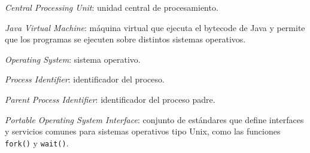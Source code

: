 \frontmatter
\maketitle
\tableofcontents
\listoffigures

\begin{abbreviations}
  \item[CPU] \textit{Central Processing Unit}: unidad central de procesamiento.
  \item[JVM] \textit{Java Virtual Machine}: máquina virtual que ejecuta el
  bytecode de Java y permite que los programas se ejecuten sobre distintos
  sistemas operativos.
  \item[OS] \textit{Operating System}: sistema operativo.
  \item[PID] \textit{Process Identifier}: identificador del proceso.
  \item[PPID] \textit{Parent Process Identifier}: identificador del proceso padre.
  \item[POSIX] \textit{Portable Operating System Interface}: conjunto de
  estándares que define interfaces y servicios comunes para sistemas
  operativos tipo Unix, como las funciones \texttt{fork()} y \texttt{wait()}.
\end{abbreviations}

\mainmatter
